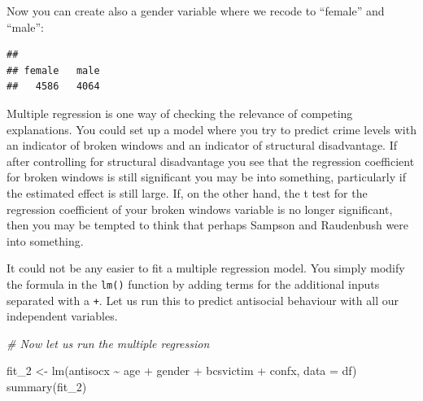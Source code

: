 \documentclass[
]{book}
\newenvironment{Shaded}{\begin{snugshade}}{\end{snugshade}}
\newcommand{\AttributeTok}[1]{\textcolor[rgb]{0.77,0.63,0.00}{#1}}
\newcommand{\CommentTok}[1]{\textcolor[rgb]{0.56,0.35,0.01}{\textit{#1}}}
\newcommand{\ConstantTok}[1]{\textcolor[rgb]{0.00,0.00,0.00}{#1}}
\newcommand{\FunctionTok}[1]{\textcolor[rgb]{0.00,0.00,0.00}{#1}}
\newcommand{\NormalTok}[1]{#1}
\newcommand{\OtherTok}[1]{\textcolor[rgb]{0.56,0.35,0.01}{#1}}
\newcommand{\SpecialCharTok}[1]{\textcolor[rgb]{0.00,0.00,0.00}{#1}}
\newcommand{\StringTok}[1]{\textcolor[rgb]{0.31,0.60,0.02}{#1}}
\begin{document}
Now you can create also a gender variable where we recode to ``female'' and ``male'':

\begin{Shaded}
\end{Shaded}

\begin{verbatim}
## 
## female   male 
##   4586   4064
\end{verbatim}

Multiple regression is one way of checking the relevance of competing explanations. You could set up a model where you try to predict crime levels with an indicator of broken windows and an indicator of structural disadvantage. If after controlling for structural disadvantage you see that the regression coefficient for broken windows is still significant you may be into something, particularly if the estimated effect is still large. If, on the other hand, the t test for the regression coefficient of your broken windows variable is no longer significant, then you may be tempted to think that perhaps Sampson and Raudenbush were into something.

It could not be any easier to fit a multiple regression model. You simply modify the formula in the \texttt{lm()} function by adding terms for the additional inputs separated with a \texttt{+}. Let us run this to predict antisocial behaviour with all our independent variables.

\begin{Shaded}
\begin{Highlighting}[]
\CommentTok{\# Now let us run the multiple regression}

\NormalTok{fit\_2 }\OtherTok{\textless{}{-}} \FunctionTok{lm}\NormalTok{(antisocx }\SpecialCharTok{\textasciitilde{}}\NormalTok{ age }\SpecialCharTok{+}\NormalTok{ gender }\SpecialCharTok{+}\NormalTok{ bcsvictim }\SpecialCharTok{+}\NormalTok{ confx, }\AttributeTok{data =}\NormalTok{ df)}
\FunctionTok{summary}\NormalTok{(fit\_2)}
\end{Highlighting}
\end{Shaded}
\end{document}
